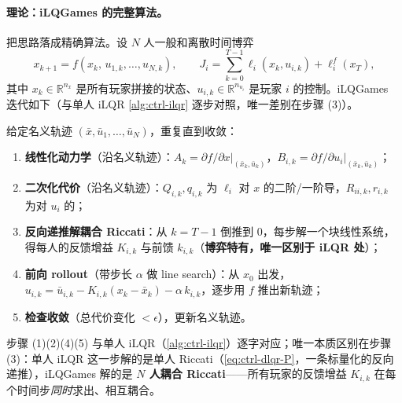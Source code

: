 \paragraph{理论：iLQGames 的完整算法。}
把思路落成精确算法。设 $N$ 人一般和离散时间博弈
\begin{equation}
  x_{k+1}=f(x_k,\,u_{1,k},\dots,u_{N,k}),\qquad
  J_i=\sum_{k=0}^{T-1}\ell_i(x_k,u_{i,k})+\ell_i^f(x_T),
  \label{eq:rtg-ilqgames-problem}
\end{equation}
其中 $x_k\in\mathbb{R}^{n_x}$ 是所有玩家拼接的状态、$u_{i,k}\in\mathbb{R}^{n_{u_i}}$ 是玩家 $i$ 的控制。iLQGames 迭代如下（与单人 iLQR \cref{alg:ctrl-ilqr} 逐步对照，唯一差别在步骤 (3)）。

\begin{algo}\label{alg:rtg-ilqgames}
给定名义轨迹 $(\bar x,\bar u_1,\dots,\bar u_N)$，重复直到收敛：
\begin{enumerate}
  \item \textbf{线性化动力学}（沿名义轨迹）：$A_k=\partial f/\partial x|_{(\bar x_k,\bar u_k)}$，$B_{i,k}=\partial f/\partial u_i|_{(\bar x_k,\bar u_k)}$；
  \item \textbf{二次化代价}（沿名义轨迹）：$Q_{i,k},q_{i,k}$ 为 $\ell_i$ 对 $x$ 的二阶/一阶导，$R_{ii,k},r_{i,k}$ 为对 $u_i$ 的；
  \item \textbf{反向递推解耦合 Riccati}：从 $k=T-1$ 倒推到 $0$，每步解一个块线性系统，得每人的反馈增益 $K_{i,k}$ 与前馈 $k_{i,k}$（\textbf{博弈特有，唯一区别于 iLQR 处}）；
  \item \textbf{前向 rollout}（带步长 $\alpha$ 做 line search）：从 $x_0$ 出发，$u_{i,k}=\bar u_{i,k}-K_{i,k}(x_k-\bar x_k)-\alpha\,k_{i,k}$，逐步用 $f$ 推出新轨迹；
  \item \textbf{检查收敛}（总代价变化 $<\epsilon$），更新名义轨迹。
\end{enumerate}
\end{algo}

\noindent 步骤 (1)(2)(4)(5) 与单人 iLQR（\cref{alg:ctrl-ilqr}）逐字对应；唯一本质区别在步骤 (3)：单人 iLQR 这一步解的是单人 Riccati（\cref{eq:ctrl-dlqr-P}，一条标量化的反向递推），iLQGames 解的是 \textbf{$N$ 人耦合 Riccati}——所有玩家的反馈增益 $K_{i,k}$ 在每个时间步\emph{同时}求出、相互耦合。

